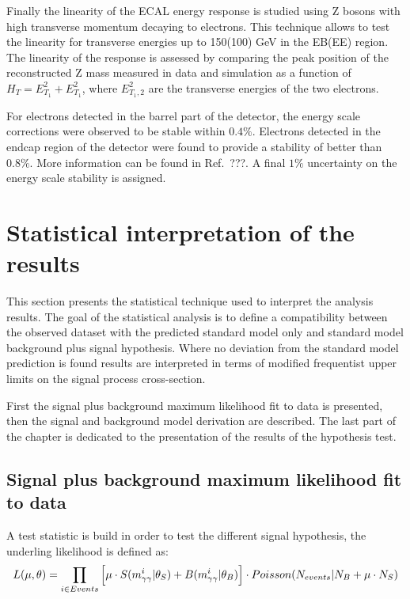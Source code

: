 Finally the linearity of the ECAL energy response is studied using Z bosons with high transverse momentum
decaying to electrons. This technique allows to test the linearity for transverse energies up to 150(100) GeV in
the EB(EE) region.
The linearity of the response is assessed by comparing the peak position of the
reconstructed Z mass measured in data and simulation as a function of $H_T = E_{T_1}^2 + E_{T_1}^2$, where
$E_{T_1,2}^2$ are the transverse energies of the two electrons.

For electrons detected in the barrel part of the detector, the energy scale corrections
were observed to be stable within $0.4\%$. Electrons detected in the endcap region of the
detector were found to provide a stability of better than $0.8\%$. More information can be
found in Ref.~???. A final $1\%$ uncertainty on the energy scale stability is assigned.

\section{Statistical interpretation of the results}
\label{sec:results}

This section presents the statistical technique used to interpret the analysis results.
The goal of the statistical analysis is to define a compatibility between the observed dataset
with the predicted standard model only and standard model background plus signal hypothesis.
Where no deviation from the standard model prediction is found results are interpreted in terms
of modified frequentist upper limits on the signal process cross-section.

First the signal plus background maximum likelihood fit to data is presented, then the signal and
background model derivation are described. The last part of the chapter is dedicated to the presentation of
the results of the hypothesis test.

\subsection{Signal plus background maximum likelihood fit to data}
A test statistic is build in order to test the different signal hypothesis, the underling likelihood
is defined as:
\begin{equation}
  \label{eq:likelihood}
  L(\mu, \theta) = \prod_{i\in Events}\Big[\mu\cdot S(m_{\gamma\gamma}^{i}|\theta_S) + B(m_{\gamma\gamma}^{i}|\theta_B)\Big]
  \cdot Poisson(N_{events}|N_B+\mu\cdot N_S)
\end{equation}

